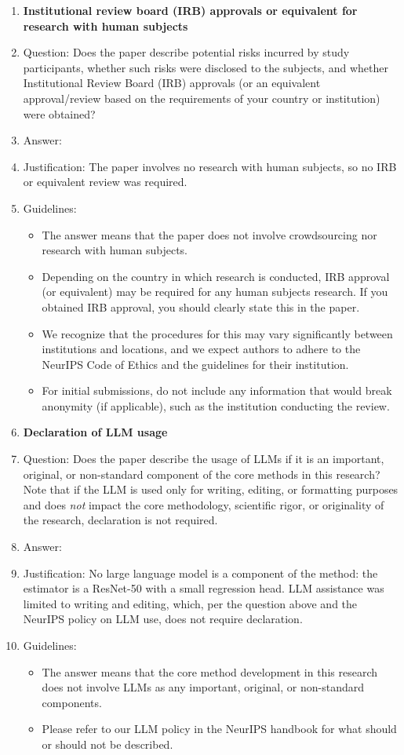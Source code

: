 \begin{enumerate}
\item {\bf Institutional review board (IRB) approvals or equivalent for research with human subjects}
    \item[] Question: Does the paper describe potential risks incurred by study participants, whether such risks were disclosed to the subjects, and whether Institutional Review Board (IRB) approvals (or an equivalent approval/review based on the requirements of your country or institution) were obtained?
    \item[] Answer: \answerNA{}
    \item[] Justification: The paper involves no research with human subjects, so no IRB or equivalent review was
    required.
    \item[] Guidelines:
    \begin{itemize}
        \item The answer \answerNA{} means that the paper does not involve crowdsourcing nor research with human subjects.
        \item Depending on the country in which research is conducted, IRB approval (or equivalent) may be required for any human subjects research. If you obtained IRB approval, you should clearly state this in the paper. 
        \item We recognize that the procedures for this may vary significantly between institutions and locations, and we expect authors to adhere to the NeurIPS Code of Ethics and the guidelines for their institution. 
        \item For initial submissions, do not include any information that would break anonymity (if applicable), such as the institution conducting the review.
    \end{itemize}

\item {\bf Declaration of LLM usage}
    \item[] Question: Does the paper describe the usage of LLMs if it is an important, original, or non-standard component of the core methods in this research? Note that if the LLM is used only for writing, editing, or formatting purposes and does \emph{not} impact the core methodology, scientific rigor, or originality of the research, declaration is not required.
    \item[] Answer: \answerNA{}
    \item[] Justification: No large language model is a component of the method: the estimator is a ResNet-50 with a
    small regression head. LLM assistance was limited to writing and editing, which, per the
    question above and the NeurIPS policy on LLM use, does not require declaration.
    \item[] Guidelines:
    \begin{itemize}
        \item The answer \answerNA{} means that the core method development in this research does not involve LLMs as any important, original, or non-standard components.
        \item Please refer to our LLM policy in the NeurIPS handbook for what should or should not be described.
    \end{itemize}

\end{enumerate}